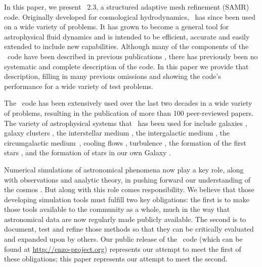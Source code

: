 In this paper, we present \enzo\ 2.3, a structured adaptive mesh
refinement (SAMR) code. Originally developed for cosmological
hydrodynamics, \enzo\ has since been used on a wide variety of
problems.  It has grown to become a general tool for astrophysical
fluid dynamics and is intended to be efficient, accurate and easily
extended to include new capabilities.  Although many of the components
of the \enzo\ code have been described in previous publications
\citep{1995CoPhC..89..149B, BryanThesis96, Bryan97a, Bryan97b,
Norman99, BryanCompSci99, Bryan01, Oshea04, 2007arXiv0705.1556N,
WangAbelZhang08,ReynoldsHayesPaschosNorman2009,Collins10,Wise11_Moray},
there has previously been no systematic and complete description of
the code.  In this paper we provide that description, filling in many
previous omissions and showing the code's performance for a wide
variety of test problems.

The \enzo\ code has been extensively used over the last two decades in
a wide variety of problems, resulting in the publication of more than
100 peer-reviewed papers. The variety of astrophysical systems that
\enzo\ has been used for include galaxies \citep{2003ApJ...587...13T,
2012MNRAS.425..641L, 2013MNRAS.432.1989S}, galaxy clusters
\citep{Loken02, Xu11, Skillman13}, the interstellar medium
\citep{Slyz05}, the intergalactic medium \citep{Fang01,
2011ApJ...731....6S}, the circumgalactic
medium~\citep{2013MNRAS.430.1548H}, cooling flows \citep{Li12,
2013ApJ...763...38S}, turbulence \citep{Kritsuk04,
2007ApJ...665..416K, 2009JPhCS.180a2020K, Collins11}, the formation of
the first stars \citep{ABN02, 2007ApJ...654...66O,
2009Sci...325..601T, Xu08}, and the formation of stars in our own
Galaxy \citep{Collins11, 2011ApJ...727L..20K, Collins12a}.

Numerical simulations of astronomical phenomena now play a key role,
along with observations and analytic theory, in pushing forward our
understanding of the cosmos \citep[e.g.,][]{DecadalSurvey01,
DecadalSurvey10}.  But along with this role comes responsibility.  We
believe that those developing simulation tools must fulfill two key
obligations: the first is to make those tools available to the
community as a whole, much in the way that astronomical data are now
regularly made publicly available.  The second is to document, test
and refine those methods so that they can be critically evaluated and
expanded upon by others.  Our public release of the \enzo\ code (which
can be found at \url{http://enzo-project.org}) represents our attempt
to meet the first of these obligations; this paper represents our
attempt to meet the second.

